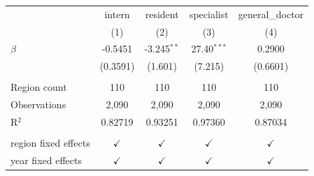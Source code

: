 \begingroup
\centering
\begin{tabular}{lcccc}
   \toprule
                        & intern        & resident      & specialist    & general\_doctor\\   
                        & (1)           & (2)           & (3)           & (4)\\  
   \midrule 
   $\beta$              & -0.5451       & -3.245$^{**}$ & 27.40$^{***}$ & 0.2900\\   
                        & (0.3591)      & (1.601)       & (7.215)       & (0.6601)\\   
    \\
   Region count         & 110           & 110           & 110           & 110\\
   Observations         & 2,090         & 2,090         & 2,090         & 2,090\\  
   R$^2$                & 0.82719       & 0.93251       & 0.97360       & 0.87034\\  
    \\
   region fixed effects & $\checkmark$  & $\checkmark$  & $\checkmark$  & $\checkmark$\\   
   year fixed effects   & $\checkmark$  & $\checkmark$  & $\checkmark$  & $\checkmark$\\   
   \bottomrule
\end{tabular}
\par\endgroup
